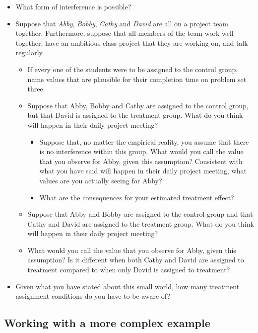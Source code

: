 \documentclass[
]{book}
\providecommand{\tightlist}{%
  \setlength{\itemsep}{0pt}\setlength{\parskip}{0pt}}
\begin{document}
\begin{itemize}
\tightlist
\item
  What form of interference is possible?
\item
  Suppose that \emph{Abby}, \emph{Bobby}, \emph{Cathy} and \emph{David}
  are all on a project team together. Furthermore, suppose that all
  members of the team work well together, have an ambitious class
  project that they are working on, and talk regularly.

  \begin{itemize}
  \tightlist
  \item
    If every one of the students were to be assigned to the control
    group, name values that are plausible for their completion time on
    problem set three.
  \item
    Suppose that Abby, Bobby and Cathy are assigned to the control
    group, but that David is assigned to the treatment group. What do
    you think will happen in their daily project meeting?

    \begin{itemize}
    \tightlist
    \item
      Suppose that, no matter the empirical reality, you assume that
      there is no interference within this group. What would you call
      the value that you observe for Abby, given this assumption?
      Consistent with what you have said will happen in their daily
      project meeting, what values are you actually seeing for Abby?
    \item
      What are the consequences for your estimated treatment effect?
    \end{itemize}
  \item
    Suppose that Abby and Bobby are assigned to the control group and
    that Cathy and David are assigned to the treatment group. What do
    you think will happen in their daily project meeting?
  \item
    What would you call the value that you observe for Abby, given this
    assumption? Is it different when both Cathy and David are assigned
    to treatment compared to when only David is assigned to treatment?
  \end{itemize}
\item
  Given what you have stated about this small world, how many treatment
  assignment conditions do you have to be aware of?
\end{itemize}

\hypertarget{working-with-a-more-complex-example}{%
\subsection{Working with a more complex
example}\label{working-with-a-more-complex-example}}
\end{document}
